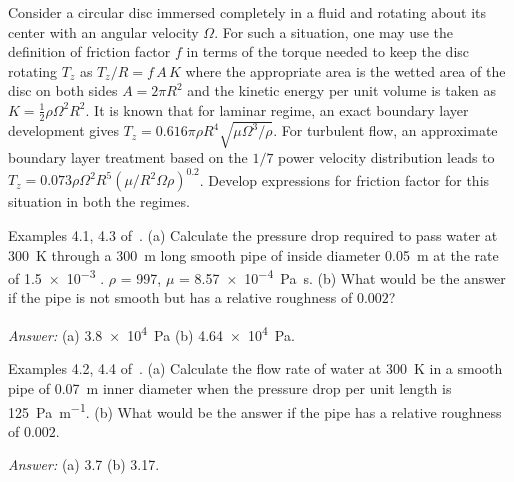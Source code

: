 
\begin{question}
Consider a circular disc immersed completely in a fluid and rotating about its center with an angular velocity $\Omega$. For such a situation, one may use the definition of friction factor $f$ in terms of the torque needed to keep the disc rotating $T_z$ as $T_z/R = f\, A \, K$ where the appropriate area is the wetted area of the disc on both sides $A=2 \pi R^2$ and the kinetic energy per unit volume is taken as $K = \frac{1}{2} \rho \Omega^2 R^2$. It is known that for laminar regime, an exact boundary layer development gives $T_z = 0.616 \pi \rho R^4 \sqrt{\mu \Omega^3 / \rho}$. For turbulent flow, an approximate boundary layer treatment based on the $1/7$ power velocity distribution leads to $T_z = 0.073 \rho \Omega^2 R^5 \left(\mu / R^2 \Omega \rho \right)^{0.2}$. Develop expressions for friction factor for this situation in both the regimes.
\end{question}
\begin{solution}[print]
\end{solution}


\begin{question}
	Examples 4.1, 4.3 of~\cite{gaskell}. (a) Calculate the pressure drop required to pass water at \SI{300}{\kelvin} through a \SI{300}{\meter} long smooth pipe of inside diameter \SI{0.05}{\metre} at the rate of \SI{1.5e-3}{\mcps} . $\rho$ = \SI{997}{\kgpmc}, $\mu$ = \SI{8.57e-4}{\pascal\second}. (b) What would be the answer if the pipe is not smooth but has a relative roughness of $0.002$?
\end{question}
\begin{solution}[print]
	{\it Answer:} (a) \SI{3.8e4}{\pascal} (b) \SI{4.64e4}{\pascal}.
\end{solution}


\begin{question}
Examples 4.2, 4.4 of~\cite{gaskell}. (a) Calculate the flow rate of water at \SI{300}{\kelvin} in a smooth pipe of \SI{0.07}{\metre} inner diameter when the pressure drop per unit length is \SI{125}{\pascal\per\metre}. (b) What would be the answer if the pipe has a relative roughness of $0.002$.
\end{question}
\begin{solution}[print]
{\it Answer:} (a) \SI{3.7}{\kgps} (b) \SI{3.17}{\kgps}.
\end{solution}

